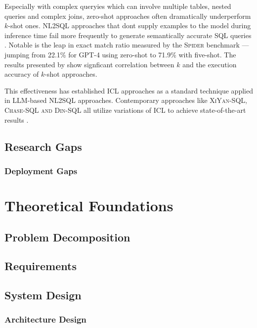 \documentclass{article}
\begin{document}
Especially with complex queryies which can involve multiple tables, nested queries and complex joins, zero-shot approaches
often dramatically underperform $k$-shot ones. NL2SQL approaches that dont supply examples to the model during inference time
fail more frequently to generate semantically accurate SQL queries \citep{DAIL-SQL}. Notable is the leap in exact match ratio
measured by the \textsc{Spider} benchmark — jumping from 22.1\% for GPT-4 using zero-shot to 71.9\% with five-shot. The
results presented by \cite{DAIL-SQL} show signficant correlation between $k$ and the execution accuracy of $k$-shot approaches.

This effectiveness has established ICL approaches as a standard technique applied in LLM-based NL2SQL approaches. Contemporary
approaches like \textsc{XiYan-SQL, Chase-SQL and Din-SQL} all utilize variations of ICL to achieve state-of-the-art results
\citep{XiYan, CHASE, DINSQL}.

\subsection{Research Gaps}

\subsubsection{Deployment Gaps}

\newpage

\section{Theoretical Foundations}

\subsection{Problem Decomposition}

\subsection{Requirements}

\subsection{System Design}

\subsubsection{Architecture Design}
\end{document}
